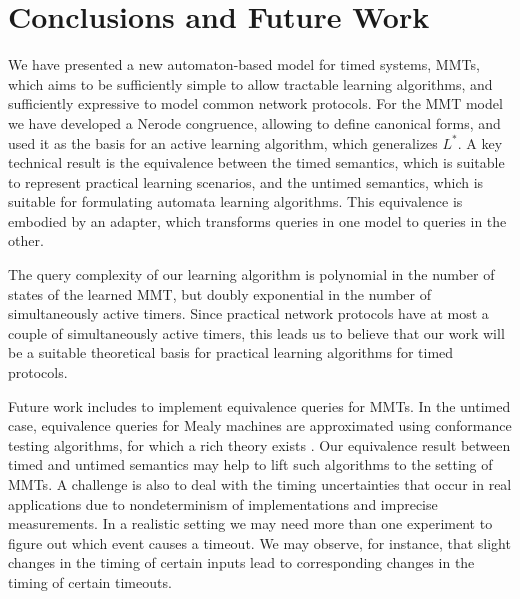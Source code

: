 
\section{Conclusions and Future Work}
\label{conclusions}

We have presented a new automaton-based model for timed systems, MMTs,
which aims to
be sufficiently simple to allow tractable learning algorithms, and sufficiently
expressive to model common network protocols. For the MMT model we have
developed a Nerode congruence, allowing to define canonical forms, and used it
as the basis for an active learning algorithm, which generalizes $L^*$.
A key technical result is the equivalence between the timed semantics,
which is suitable to represent practical learning scenarios, and the
untimed semantics, which is suitable for formulating automata learning
algorithms. This equivalence is embodied by an adapter, which transforms
queries in one model to queries in the other.

The query complexity of our learning algorithm is polynomial in the number of
states of the learned MMT, but doubly exponential in the number of simultaneously
active timers. Since practical network protocols have at most a couple of
simultaneously active timers, this leads us to believe that our work will
be a suitable theoretical basis for practical learning algorithms for timed
protocols.

Future work includes to implement equivalence queries for MMTs.
In the untimed case, equivalence queries for Mealy machines are approximated using conformance testing algorithms,
for which a rich theory exists \cite{LeeY96}.
Our equivalence result between timed and untimed semantics may help to
lift such algorithms to the setting of MMTs.
A challenge is also to deal with the timing uncertainties that occur in real applications due to nondeterminism of
implementations and imprecise measurements. In a realistic
setting we may need more than one experiment to figure out which event causes a timeout. We may observe, for instance,
that slight changes in the timing of certain inputs lead to corresponding changes in the timing of certain timeouts.

